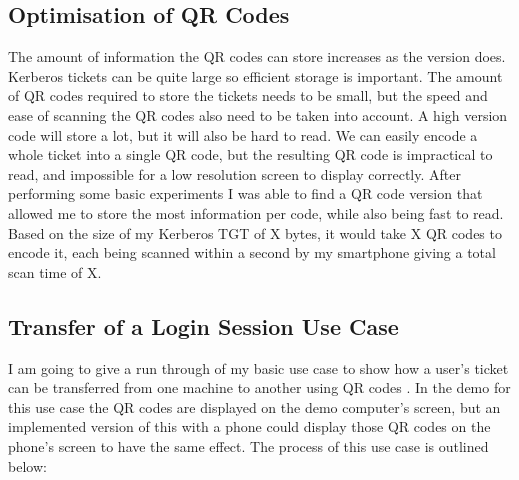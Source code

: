 \documentclass[]{report}   %
\begin{document}
\subsection{Optimisation of QR Codes}
The amount of information the QR codes can store increases as the version does. Kerberos tickets can be quite large so efficient storage is important. The amount of QR codes required to store the tickets needs to be small, but the speed and ease of scanning the QR codes also need to be taken into account. A high version code will store a lot, but it will also be hard to read. We can easily encode a whole ticket into a single QR code, but the resulting QR code is impractical to read, and impossible for a low resolution screen to display correctly. After performing some basic experiments I was able to find a QR code version that allowed me to store the most information per code, while also being fast to read. Based on the size of my Kerberos TGT of X bytes, it would take X QR codes to encode it, each being scanned within a second by my smartphone giving a total scan time of X.


\subsection{Transfer of a Login Session Use Case}
I am going to give a run through of my basic use case to show how a user’s ticket can be transferred from one machine to another using QR codes . In the demo for this use case the QR codes are displayed on the demo computer's screen, but an implemented version of this with a phone could display those QR codes on the phone's screen to have the same effect. The process of this use case is outlined below:


\end{document}
